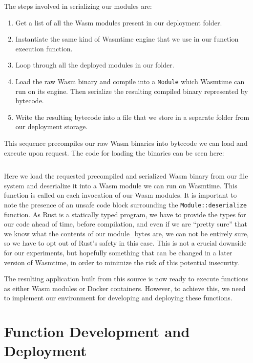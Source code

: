 \documentclass[
  table]{report}
\providecommand{\tightlist}{%
  \setlength{\itemsep}{0pt}\setlength{\parskip}{0pt}}
\begin{document}
\inputminted{rust}{assets/code/serialize_wasm.rs}

The steps involved in serializing our modules are:

\begin{enumerate}
\def\labelenumi{\arabic{enumi}.}
\tightlist
\item
  Get a list of all the \ac{Wasm} modules present in our deployment
  folder.
\item
  Instantiate the same kind of Wasmtime engine that we use in our
  function execution function.
\item
  Loop through all the deployed modules in our folder.
\item
  Load the raw \ac{Wasm} binary and compile into a \texttt{Module} which
  Wasmtime can run on its engine. Then serialize the resulting compiled
  binary represented by bytecode.
\item
  Write the resulting bytecode into a file that we store in a separate
  folder from our deployment storage.
\end{enumerate}

This sequence precompiles our raw \ac{Wasm} binaries into bytecode we
can load and execute upon request. The code for loading the binaries can
be seen here:

\inputminted{rust}{assets/code/load_wasm.rs}

Here we load the requested precompiled and serialized \ac{Wasm} binary
from our file system and deserialize it into a \ac{Wasm} module we can
run on Wasmtime. This function is called on each invocation of our
\ac{Wasm} modules. It is important to note the presence of an unsafe
code block surrounding the \texttt{Module::deserialize} function. As
Rust is a statically typed program, we have to provide the types for our
code ahead of time, before compilation, and even if we are ``pretty
sure'' that we know what the contents of our module\_bytes are, we can
not be entirely sure, so we have to opt out of Rust's safety in this
case. This is not a crucial downside for our experiments, but hopefully
something that can be changed in a later version of Wasmtime, in order
to minimize the risk of this potential insecurity.

The resulting application built from this source is now ready to execute
functions as either \ac{Wasm} modules or Docker containers. However, to
achieve this, we need to implement our environment for developing and
deploying these functions.

\section{Function Development and Deployment}
\end{document}
